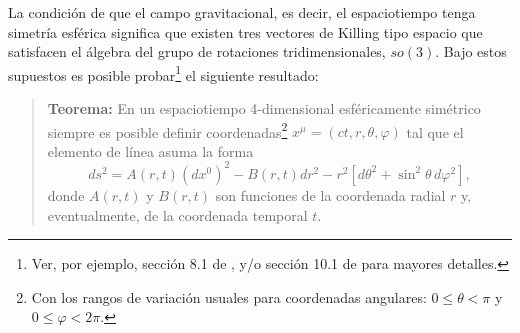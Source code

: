 La condición de que el campo gravitacional, es decir, el espaciotiempo tenga
simetría esférica significa que existen tres vectores de Killing tipo espacio que satisfacen el álgebra del grupo de rotaciones tridimensionales, $so(3)$. Bajo estos supuestos es posible probar\footnote{Ver, por ejemplo, sección 8.1 de \cite{Wei72}, y/o sección 10.1 de \cite{FC} para mayores detalles.} el siguiente resultado:

\begin{quotation}
{\bf Teorema:} En un espaciotiempo 4-dimensional esféricamente simétrico
siempre es posible definir coordenadas\footnote{Con los rangos de variación usuales para coordenadas angulares: $0\le\theta<\pi$ y $0\le\varphi <2\pi$.} $x^\mu=(ct,r,\theta,\varphi)$ tal
que el elemento de línea asuma la forma
\begin{equation}\label{dsoriginal}
ds^2=A(r,t)(dx^0)^2-B(r,t)dr^2-r^2\left[ d\theta^2+\sin^2\theta
\,d\varphi^2\right],
\end{equation}
donde $A(r,t)$ y $B(r,t)$ son funciones de la coordenada radial $r$ y,
eventualmente, de la coordenada temporal $t$.
\end{quotation}

